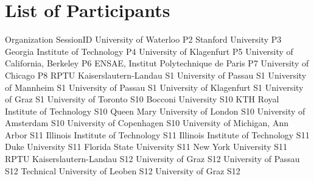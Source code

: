 \chapter{List of Participants}

\setlength{\columnsep}{1cm}

\begin{multicols}{2}

\small\raggedright

{Organization}
{SessionID}
{}
{University of Waterloo}
{P2}
{}
{Stanford University}
{P3}
{}
{Georgia Institute of Technology}
{P4}
{}
{University of Klagenfurt}
{P5}
{}
{University of California, Berkeley}
{P6}
{}
{ENSAE, Institut Polytechnique de Paris}
{P7}
{}
{University of Chicago}
{P8}
{}
{RPTU Kaiserslautern-Landau}
{S1}
{}
{University of Passau}
{S1}
{}
{University of Mannheim}
{S1}
{}
{University of Passau}
{S1}
{}
{University of Klagenfurt}
{S1}
{}
{University of Graz}
{S1}
{}
{University of Toronto}
{S10}
{}
{Bocconi University}
{S10}
{}
{KTH Royal Institute of Technology}
{S10}
{}
{Queen Mary University of London}
{S10}
{}
{University of Amsterdam}
{S10}
{}
{University of Copenhagen}
{S10}
{}
{University of Michigan, Ann Arbor}
{S11}
{}
{Illinois Institute of Technology}
{S11}
{}
{Illinois Institute of Technology}
{S11}
{}
{Duke University}
{S11}
{}
{Florida State University}
{S11}
{}
{New York University}
{S11}
{}
{RPTU Kaiserslautern-Landau}
{S12}
{}
{University of Graz}
{S12}
{}
{University of Passau}
{S12}
{}
{Technical University of Leoben}
{S12}
{}
{University of Graz}
{S12}
{}

\end{multicols}
